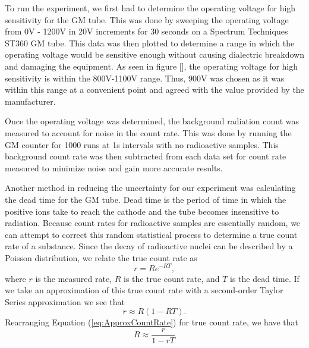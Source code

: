 
\par \indent To run the experiment, we first had to determine the operating voltage for high sensitivity for the GM tube. This was done by sweeping the operating voltage from 0V - 1200V in 20V increments for 30 seconds on a Spectrum Techniques ST360 GM tube. This data was then plotted to determine a range in which the operating voltage would be sensitive enough without causing dialectric breakdown and damaging the equipment. As seen in figure [], the operating voltage for high sensitivity is within the 800V-1100V range. Thus, 900V was chosen as it was within this range at a convenient point and agreed with the value provided by the manufacturer.

\par Once the operating voltage was determined, the background radiation count was measured to account for noise in the count rate. This was done by running the GM counter for 1000 runs at 1s intervals with no radioactive samples. This background count rate was then subtracted from each data set for count rate measured to minimize noise and gain more accurate results.

\par Another method in reducing the uncertainty for our experiment was calculating the dead time for the GM tube. Dead time is the period of time in which the positive ions take to reach the cathode and the tube becomes insensitive to radiation. Because count rates for radioactive samples are essentially random, we can attempt to correct this random statistical process to determine a true count rate of a substance.  Since the decay of radioactive nuclei can be described by a Poisson distribution, we relate the true count rate as\cite{Spectrum}
\begin{equation}
r = Re^{-RT}, 
\label{eq:ActualCountRate}
\end{equation}
where $r$ is the measured rate, $R$ is the true count rate, and $T$ is the dead time. If we take an approximation of this true count rate with a second-order Taylor Series approximation we see that
\begin{equation}
r \approx R(1-RT).
\label{eq:ApproxCountRate}
\end{equation}
Rearranging Equation (\ref{eq:ApproxCountRate}) for true count rate, we have that
\begin{equation}
R \approx \frac{r}{1-rT}
\label{eq:TrueCountRate}
\end{equation}

